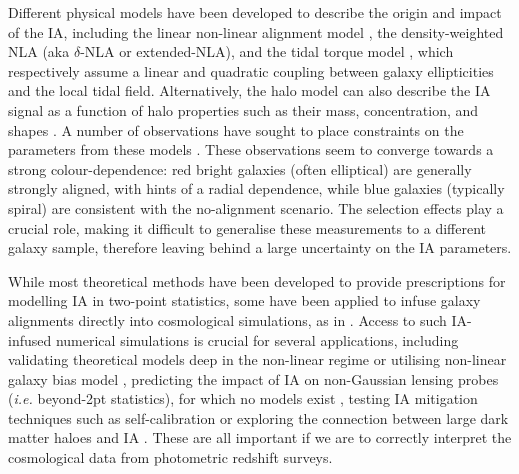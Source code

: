 Different physical models have been developed to describe the origin and impact of the IA, including the linear non-linear alignment model \citep[NLA hereafter, ][]{NLA}, the density-weighted NLA (aka $\delta$-NLA or extended-NLA), and the tidal torque model \citep[][TT hereafter]{TATT}, which respectively assume a linear and quadratic coupling between galaxy ellipticities and the local tidal field. 
Alternatively, the halo model can also describe the IA signal as a function of halo properties such as their mass, concentration, and shapes \citep{Fortuna2020}.
A number of observations have sought to place constraints on the parameters from these models \citep[\eg][]{BlueIA, Singh_IA_LOWZ, DESY1_IA_Samuroff, Johnston_IA} .
These observations seem to converge towards a strong colour-dependence: red bright galaxies (often elliptical) are generally strongly aligned, with hints of a radial dependence, while blue galaxies (typically spiral) are consistent with the no-alignment scenario.
The selection effects play a crucial role, making it difficult to generalise these measurements to a different galaxy sample, therefore leaving behind a large uncertainty on the IA parameters.


While most theoretical methods have been developed to provide prescriptions for modelling IA in two-point statistics, some have been applied to infuse galaxy alignments directly into cosmological simulations, as in \citet{Fluri2019, Tidalator2D, MICE_IA, Lanzieri2023, vanAlfen2023}. 
Access to such IA-infused numerical simulations is crucial for several applications, including 
validating theoretical models deep in the non-linear regime or utilising non-linear galaxy bias model \citep{IA_gal_bias}, 
 predicting the impact of IA on non-Gaussian lensing probes ({\it i.e.} beyond-2pt statistics), for which no models exist \citep{Zuercher2020a, Tidalator2D},
testing IA mitigation techniques such as self-calibration \citep[][Bera et al in prep.]{SelfCalibrationYao1, SelfCalibrationYao2, SelCalibrationPedersen} or exploring the connection between large dark matter haloes and IA \citep{vanAlfen2023}.
{} These are all important if we are to correctly interpret the cosmological data from photometric redshift surveys. 

